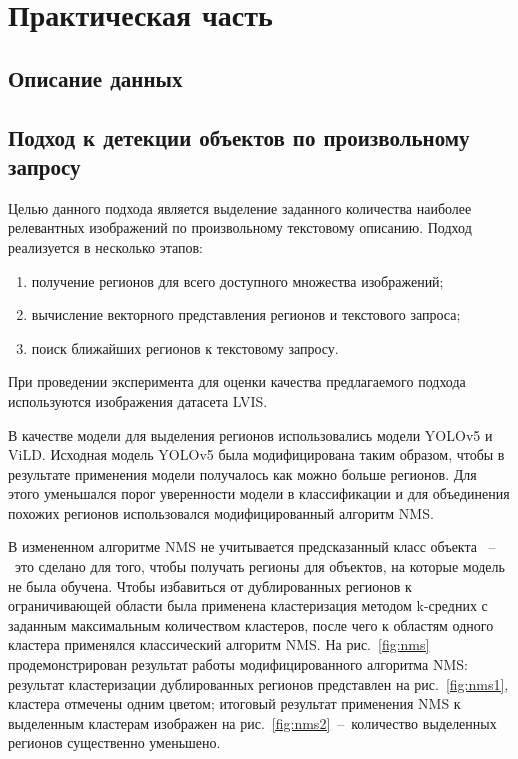 \documentclass[a4paper,14pt]{article}
\begin{document}
    \newpage


    \section{Практическая часть}

    \subsection{Описание данных}

    \subsection{Подход к детекции объектов по произвольному запросу}

    Целью данного подхода является выделение заданного количества наиболее релевантных изображений по произвольному текстовому описанию.
    Подход реализуется в несколько этапов:
    \begin{enumerate}
        [1)]
        \itemsep0em
        \item получение регионов для всего доступного множества изображений;
        \item вычисление векторного представления регионов и текстового запроса;
        \item поиск ближайших регионов к текстовому запросу.
    \end{enumerate}

    При проведении эксперимента для оценки качества предлагаемого подхода используются изображения датасета LVIS.

    В качестве модели для выделения регионов использовались модели YOLOv5 и ViLD.
    Исходная модель YOLOv5 была модифицирована таким образом, чтобы в результате применения модели получалось как можно больше регионов.
    Для этого уменьшался порог уверенности модели в классификации и для объединения похожих регионов использовался модифицированный алгоритм NMS.

    В измененном алгоритме NMS не учитывается предсказанный класс объекта ~--~это сделано для того, чтобы получать регионы для объектов, на которые модель не была обучена.
    Чтобы избавиться от дублированных регионов к ограничивающей области была применена кластеризация методом k-средних с заданным максимальным количеством кластеров, после чего к областям одного кластера применялся классический алгоритм NMS.
    На рис.~\ref{fig:nms} продемонстрирован результат работы модифицированного алгоритма NMS: результат кластеризации дублированных регионов представлен на рис.~\ref{fig:nms1}, кластера отмечены одним цветом; итоговый результат применения NMS к выделенным кластерам изображен на рис.~\ref{fig:nms2}~--~количество выделенных регионов существенно уменьшено.
\end{document}
